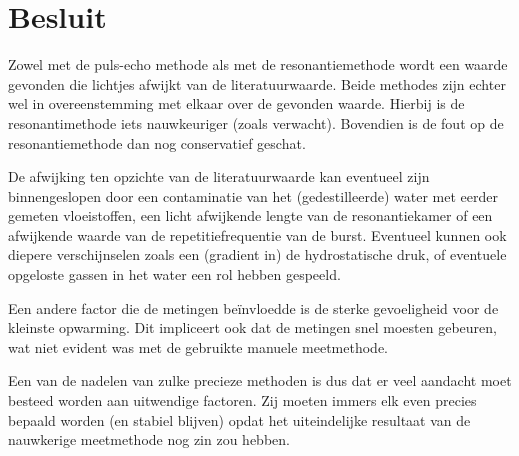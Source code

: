 \section{Besluit}
Zowel met de puls-echo methode als met de resonantiemethode wordt een 
waarde gevonden die lichtjes afwijkt van de literatuurwaarde. Beide 
methodes zijn echter wel in overeenstemming met elkaar over de gevonden 
waarde.  Hierbij is de resonantimethode iets nauwkeuriger (zoals verwacht). 
Bovendien is de fout op de resonantiemethode dan nog conservatief geschat.

De afwijking ten opzichte van de literatuurwaarde kan eventueel zijn 
binnengeslopen door een contaminatie van het (gedestilleerde) water met 
eerder gemeten vloeistoffen, een licht afwijkende lengte van de 
resonantiekamer of een afwijkende waarde van de repetitiefrequentie van de 
burst. Eventueel kunnen ook diepere verschijnselen zoals een (gradient in) 
de hydrostatische druk, of eventuele opgeloste gassen in het water een rol 
hebben gespeeld.

Een andere factor die de metingen be\"invloedde is de sterke gevoeligheid 
voor de kleinste opwarming. Dit impliceert ook dat de metingen snel moesten 
gebeuren, wat niet evident was met de gebruikte manuele meetmethode.

Een van de nadelen van zulke precieze methoden is dus dat er veel aandacht 
moet besteed worden aan uitwendige factoren. Zij moeten immers elk even 
precies bepaald worden (en stabiel blijven) opdat het uiteindelijke 
resultaat van de nauwkerige meetmethode nog zin zou hebben.
